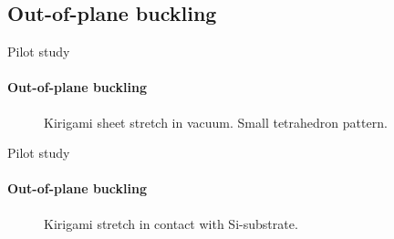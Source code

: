 \documentclass[
	10pt, %
]{beamer}
\begin{document}
\subsection{Out-of-plane buckling}
\begin{frame}{Pilot study}
	\framesubtitle{Out-of-plane buckling}
	\begin{figure}
		\centering    
		\caption{Kirigami sheet stretch in vacuum. Small tetrahedron pattern.}
	\end{figure} 

\end{frame}
%
%
\begin{frame}{Pilot study}
	\framesubtitle{Out-of-plane buckling}
	\begin{figure}
		\centering    
		\caption{Kirigami stretch in contact with Si-substrate.}
	\end{figure} 
\end{frame}
\end{document}
